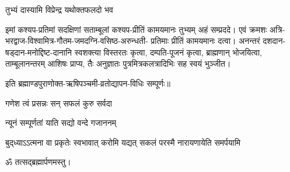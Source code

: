 {तुभ्यं दास्यामि विप्रेन्द्र यथोक्तफलदो भव}

इमां कश्यप-प्रतिमां सदक्षिणां सताम्बूलां कश्यप-प्रीतिं कामयमानः तुभ्यम् अहं
सम्प्रददे। एवं क्रमशः अत्रि-भरद्वाज-विश्वामित्र-गौतम-जमदग्नि-वसिष्ठ-अरुन्धती-
प्रतिमाः प्रीतिं कामयमानः दत्वा। अनन्तरं दशदान-षड्दान-मनोद्दिष्ट-दानानि
स्वशक्त्या विस्तरतः कृत्वा, दम्पति-पूजनं कृत्वा, ब्राह्मणान् भोजयित्वा,
ताम्बूलानन्तरम् आशिषः प्राप्य, तैः अनुज्ञातः पुत्रमित्रकलत्रादिभिः सह स्वयं
भुञ्जीत।

इति ब्रह्माण्डपुराणोक्त-ऋषिपञ्चमी-व्रतोद्यापन-विधिः सम्पूर्णः॥

\closesub


{गणेश त्वं प्रसन्नः सन् सफलं कुरु सर्वदा}


{न्यूनं सम्पूर्णतां याति सद्यो वन्दे गजाननम्}

{बुद्‌ध्याऽऽत्मना वा प्रकृतेः स्वभावात्}
{करोमि यद्यत् सकलं परस्मै}
{नारायणायेति समर्पयामि}

\centerline{ॐ तत्सद्ब्रह्मार्पणमस्तु।}


\closesection
